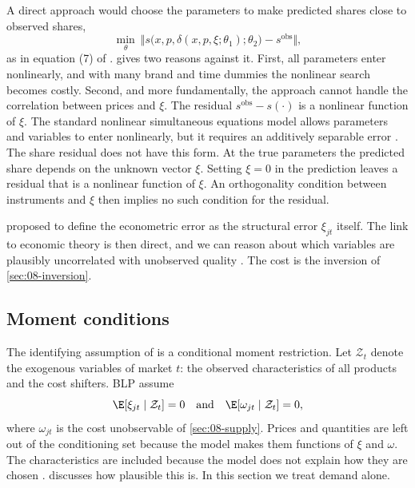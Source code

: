 A direct approach would choose the parameters to make predicted shares close to observed shares,
\begin{equation*}
  \min_{\theta}\ \big\Vert s\big(x, p, \delta(x, p, \xi;\theta_1);\theta_2\big) - s^{\text{obs}}\big\Vert,
\end{equation*}
as in equation (7) of \citet{Nevo2000a}.  gives two reasons against it. First,
all parameters enter nonlinearly, and with many brand and time dummies the nonlinear search becomes costly.
Second, and more fundamentally, the approach cannot handle the correlation between prices and $\xi$. The
residual $s^{\text{obs}} - s(\cdot)$ is a nonlinear function of $\xi$. The standard nonlinear simultaneous equations
model allows parameters and variables to enter nonlinearly, but it requires an additively separable error
\citep[p.~531]{Nevo2000a}. The share residual does not have this form. At the true parameters the
predicted share depends on the unknown vector $\xi$. Setting $\xi = 0$ in the prediction leaves a residual
that is a nonlinear function of $\xi$. An orthogonality condition between instruments and $\xi$ then implies no
such condition for the residual.

\citet{Berry1994} proposed to define the econometric error as the structural error $\xi_{jt}$ itself. The
link to economic theory is then direct, and we can reason about which variables are plausibly uncorrelated
with unobserved quality \citep[p.~531]{Nevo2000a}. The cost is the inversion of \cref{sec:08-inversion}.

\subsection{Moment conditions}\label{sec:08-moments}

The identifying assumption of \citet[eq.~4.1]{BerryLevinsohnPakes1995} is a conditional moment restriction.
Let $\mathcal{Z}_t$ denote the exogenous variables of market $t$: the observed characteristics of all products
and the cost shifters. BLP assume
\begin{equation}\label{eq:08-cond-moment}
  \E[\xi_{jt} \mid \mathcal{Z}_t] = 0 \quad\text{and}\quad \E[\omega_{jt} \mid \mathcal{Z}_t] = 0,
\end{equation}
where $\omega_{jt}$ is the cost unobservable of \cref{sec:08-supply}. Prices and quantities are left out of
the conditioning set because the model makes them functions of $\xi$ and $\omega$. The characteristics are
included because the model does not explain how they are chosen \citep[p.~854]{BerryLevinsohnPakes1995}.
 discusses how plausible this is. In this section we treat demand alone.

